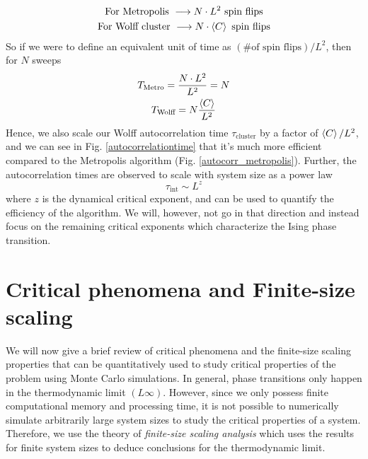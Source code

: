 \documentclass[../thesis_main.tex]{subfiles}
\begin{document}
\begin{gather*}
    \text{For Metropolis } \longrightarrow N \cdot L^2 \text{ spin flips} \\
    \text{For Wolff cluster } \longrightarrow N \cdot \expval{C} \text{ spin flips}
\end{gather*}
So if we were to define an equivalent unit of time as $(\text{\# of spin flips})/L^2$, then for $N$ sweeps
\begin{gather*}
    T_\text{Metro} = \frac{N \cdot L^2}{L^2} = N \\
    T_\text{Wolff} = N \frac{\expval{C}}{L^2}
\end{gather*}     
Hence, we also scale our Wolff autocorrelation time $\tau_\text{cluster}$ by a factor of $\expval{C}/L^2$, and we can see in Fig. \ref{autocorrelationtime} that it's much more efficient compared to the Metropolis algorithm (Fig. \ref{autocorr_metropolis}). Further, the autocorrelation times are observed to scale with system size as a power law 
\[
    \tau_\text{int} \sim L^z
\]
where $z$ is the dynamical critical exponent, and can be used to quantify the efficiency of the algorithm. We will, however, not go in that direction and instead focus on the remaining critical exponents which characterize the Ising phase transition. 

\section{Critical phenomena and Finite-size scaling}
We will now give a brief review of critical phenomena and the finite-size scaling properties that can be quantitatively used to study critical properties of the problem using Monte Carlo simulations. In general, phase transitions only happen in the thermodynamic limit $(L  \infty)$. However, since we only possess finite computational memory and processing time, it is not possible to numerically simulate arbitrarily large system sizes to study the critical properties of a system. Therefore, we use the theory of \textit{finite-size scaling analysis} which uses the results for finite system sizes to deduce conclusions for the thermodynamic limit. 
\end{document}
